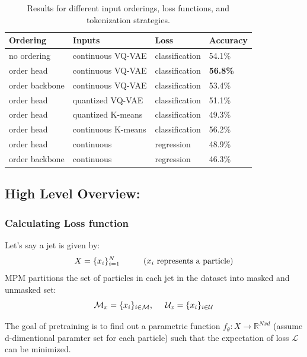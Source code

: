 \documentclass[letterpaper,12pt]{article}
\newcommand{\la}{\mathcal{L}}
\newcommand{\ma}{\mathcal{M}}
\newcommand{\ua}{\mathcal{U}}
\begin{document}
\begin{spacing}{1.125}
\begin{table}[ht!]
\centering
\begin{tabular}{@{}llll@{}}
\toprule
\textbf{Ordering} & \textbf{Inputs}     & \textbf{Loss}               & \textbf{Accuracy} \\ \midrule
no ordering       & continuous VQ-VAE   & classification              & 54.1\%            \\
order head        & continuous VQ-VAE   & classification              &\textbf{56.8\%}            \\
order backbone    & continuous VQ-VAE   & classification              & 53.4\%            \\
order head        & quantized VQ-VAE    & classification              & 51.1\%            \\
order head        & quantized K-means   & classification              & 49.3\%            \\
order head        & continuous K-means  & classification              & 56.2\%            \\
order head        & continuous          & regression                  & 48.9\%            \\
order backbone    & continuous          & regression                  & 46.3\%            \\ \bottomrule
\end{tabular}
\caption{Results for different input orderings, loss functions, and tokenization strategies.}
\label{tokentable}
\end{table}

\subsection{High Level Overview:}

\subsubsection{Calculating Loss function}

Let's say a jet is given by:
    $$ X = \{x_i\}_{i=1}^{N} \text{\hspace{1cm}($x_i$ represents a particle)} $$
    MPM partitions the set of particles in each jet in the dataset into masked and unmasked
    set:
    $$ \ma_x = \{x_i\}_{i\in \ma}, \hspace{0.5cm} \ua_x = \{x_i\}_{i\in \ua}$$

    The goal of pretraining is to find out a parametric function $f_\theta: X \to
    \mathbb{R}^{Nxd}$ (assume d-dimentional paramter set for each particle) such that the expectation of loss $\la$ can be minimized.


\end{spacing}
\end{document}
